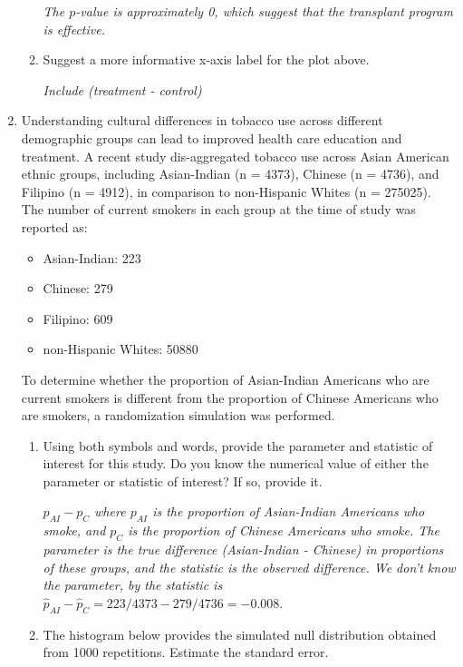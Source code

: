 \documentclass[12pt]{article}   	%
\newcommand{\soln}[2]{\textit{\textcolor{custom_red}{#2}}}{}
\begin{document}
\begin{enumerate}
\begin{enumerate}
    \soln{}{The $p$-value is approximately 0, which suggest that the transplant program is effective. }
  \item
    Suggest a more informative x-axis label for the plot above.
   
   \soln{}{Include (treatment - control)}
  \end{enumerate}
\item
  Understanding cultural differences in tobacco use across different
  demographic groups can lead to improved health care education and
  treatment. A recent study dis-aggregated tobacco use across Asian
  American ethnic groups, including Asian-Indian (n = 4373), Chinese (n
  = 4736), and Filipino (n = 4912), in comparison to non-Hispanic Whites
  (n = 275025). The number of current smokers in each group at the time
  of study was reported as:

  \begin{itemize}
  \item
    Asian-Indian: 223
  \item
    Chinese: 279
  \item
    Filipino: 609
  \item
    non-Hispanic Whites: 50880
  \end{itemize}

  To determine whether the proportion of Asian-Indian Americans who are
  current smokers is different from the proportion of Chinese Americans
  who are smokers, a randomization simulation was performed.

  \begin{enumerate}
  \item
    Using both symbols and words, provide the parameter and statistic of
    interest for this study. Do you know the numerical value of either
    the parameter or statistic of interest? If so, provide it.
    
    \soln{}{$p_{AI} - p_{C}$ where $p_{AI}$ is the proportion of Asian-Indian Americans who smoke, and $p_{C}$ is the proportion of Chinese Americans who smoke. The parameter is the true difference (Asian-Indian - Chinese) in proportions of these groups, and the statistic is the observed difference. We don't know the parameter, by the statistic is $\hat{p}_{AI} - \hat{p}_{C} = 223/4373 - 279/4736 = -0.008.$}
  \item
    The histogram below provides the simulated null distribution
    obtained from 1000 repetitions. Estimate the standard error.


\end{enumerate}
\end{enumerate}
\end{document}
